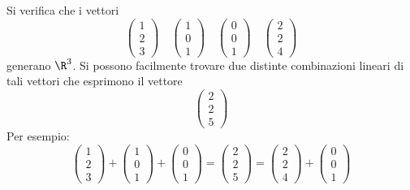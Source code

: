 \begin{example}
	Si verifica che i vettori
	\[
		\begin{pmatrix}
			1 \\ 2 \\ 3
		\end{pmatrix} \quad
		\begin{pmatrix}
			1 \\ 0 \\ 1
		\end{pmatrix} \quad
		\begin{pmatrix}
			0 \\ 0 \\ 1
		\end{pmatrix} \quad
		\begin{pmatrix}
			2 \\ 2 \\ 4
		\end{pmatrix}
	\]
	generano $\R^3$. Si possono facilmente trovare due distinte combinazioni
	lineari di tali vettori che esprimono il vettore
	\[ \begin{pmatrix} 2 \\ 2 \\ 5 \end{pmatrix} \]
	Per esempio:
	\[
		\begin{pmatrix}
			1 \\ 2 \\ 3
		\end{pmatrix} +
		\begin{pmatrix}
			1 \\ 0 \\ 1
		\end{pmatrix} +
		\begin{pmatrix}
			0 \\ 0 \\ 1
		\end{pmatrix} =
		\begin{pmatrix}
			2 \\ 2 \\ 5
		\end{pmatrix} =
		\begin{pmatrix}
			2 \\ 2 \\ 4
		\end{pmatrix} +
		\begin{pmatrix}
			0 \\ 0 \\ 1
		\end{pmatrix}
	\]
\end{example}

